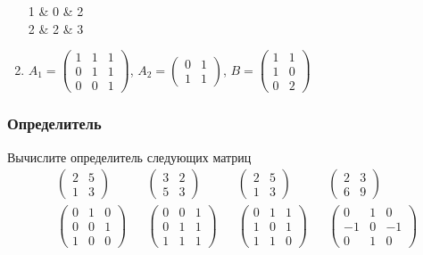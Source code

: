 \begin{exercise}
\begin{enumerate}
\begin{pmatrix}
		1 & 0 & 2 \\ 2 & 2 & 3
	\end{pmatrix}\)
	\item \(A_1=\begin{pmatrix}
		1 & 1 & 1 \\ 0 & 1 & 1 \\ 0 & 0 & 1
	\end{pmatrix}\), \(A_2=\begin{pmatrix}
		0 & 1 \\ 1 & 1
	\end{pmatrix}\), \(B=\begin{pmatrix}
		1 & 1 \\ 1 & 0 \\ 0 & 2
	\end{pmatrix}\)
\end{enumerate}
\end{exercise}

\subsubsection{Определитель}

\begin{exercise}
Вычислите определитель следующих матриц
\begin{align*}
	& \begin{pmatrix}
		2 & 5 \\ 1 & 3
	\end{pmatrix} &
	& \begin{pmatrix}
		3 & 2 \\ 5 & 3
	\end{pmatrix} &
	& \begin{pmatrix}
		2 & 5 \\ 1 & 3
	\end{pmatrix} &
	& \begin{pmatrix}
		2 & 3 \\ 6 & 9
	\end{pmatrix} \\
	& \begin{pmatrix}
		0 & 1 & 0 \\ 0 & 0 & 1 \\ 1 & 0 & 0
	\end{pmatrix} &
	& \begin{pmatrix}
		0 & 0 & 1 \\ 0 & 1 & 1 \\ 1 & 1 & 1
	\end{pmatrix} &
	& \begin{pmatrix}
		0 & 1 & 1 \\ 1 & 0 & 1 \\ 1 & 1 & 0
	\end{pmatrix} &
	& \begin{pmatrix}
		0 & 1 & 0 \\ -1 & 0 & -1 \\ 0 & 1 & 0
	\end{pmatrix}
\end{align*}
\end{exercise}


